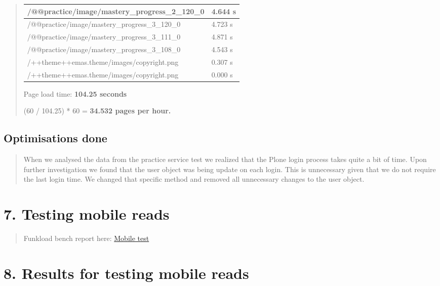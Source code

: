 \documentclass[letterpaper,10pt,english]{sphinxmanual}
\begin{document}
\begin{quote}
\begin{tabulary}{\linewidth}{|L|L|}
/@@practice/image/mastery\_progress\_2\_120\_0
 & 
4.644 s
\\\hline

/@@practice/image/mastery\_progress\_3\_120\_0
 & 
4.723 s
\\\hline

/@@practice/image/mastery\_progress\_3\_111\_0
 & 
4.871 s
\\\hline

/@@practice/image/mastery\_progress\_3\_108\_0
 & 
4.543 s
\\\hline

/++theme++emas.theme/images/copyright.png
 & 
0.307 s
\\\hline

/++theme++emas.theme/images/copyright.png
 & 
0.000 s
\\\hline
\end{tabulary}


Page load time: \textbf{104.25 seconds}

(60 / 104.25) * 60 = \textbf{34.532 pages per hour.}
\end{quote}


\section{Optimisations done}
\label{index:id6}\begin{quote}

When we analysed the data from the practice service test we realized that
the Plone login process takes quite a bit of time.  Upon further
investigation we found that the user object was being update on each login.
This is unnecessary given that we do not require the last login time.  We
changed that specific method and removed all unnecessary changes to the
user object.
\end{quote}


\chapter{7. Testing mobile reads}
\label{index:testing-mobile-reads}\begin{quote}

Funkload bench report here: \href{http://197.221.50.101/stats/}{Mobile test}
\end{quote}


\chapter{8. Results for testing mobile reads}
\label{index:results-for-testing-mobile-reads}
\end{document}

